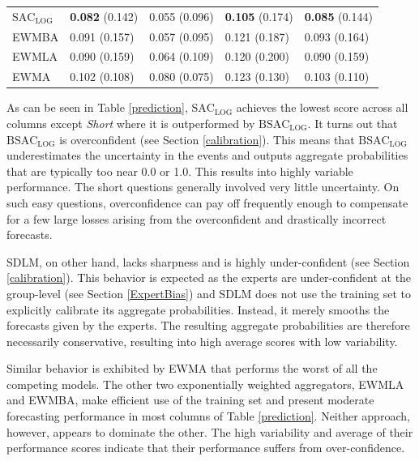 \documentclass[aoas, preprint]{imsart}
\numberwithin{equation}{section}
\theoremstyle{plain}
\begin{document}
\begin{table}
\begin{tabular}{l llll}
$\text{SAC}_{\text{LOG}}$ & \textbf{0.082} (0.142) & 0.055 (0.096) & \textbf{0.105} (0.174) & \textbf{0.085} (0.144)\\ 
EWMBA & 0.091 (0.157) & 0.057 (0.095) & 0.121 (0.187) & 0.093 (0.164)\\ 
EWMLA & 0.090 (0.159) & 0.064 (0.109) & 0.120 (0.200) & 0.090 (0.159)\\ 
EWMA & 0.102 (0.108) & 0.080 (0.075) & 0.123 (0.130) & 0.103 (0.110)\\ 
\hline
   \end{tabular}
\end{table}


As can be seen in Table \ref{prediction}, $\text{SAC}_{\text{LOG}}$ achieves the lowest score across all columns except \textit{Short} where it is outperformed by $\text{BSAC}_{\text{LOG}}$. It turns out that $\text{BSAC}_{\text{LOG}}$ is overconfident (see Section \ref{calibration}). This means that $\text{BSAC}_{\text{LOG}}$ underestimates the uncertainty in the events and outputs aggregate probabilities that are typically too near 0.0 or 1.0. 
This results into highly variable performance. The short questions generally involved very little uncertainty. On such easy questions, overconfidence can pay off frequently enough to compensate for a few large losses arising from the overconfident and drastically incorrect forecasts. 

SDLM, on other hand, lacks sharpness and is highly under-confident (see Section \ref{calibration}). This behavior is expected as the experts are under-confident at the group-level (see Section \ref{ExpertBias}) and SDLM does not use the training set to explicitly calibrate its aggregate probabilities. Instead, it merely smooths the forecasts given by the experts. The resulting aggregate probabilities are therefore necessarily conservative, resulting into high average scores with low variability. 

 Similar behavior is exhibited by EWMA that performs the worst of all the competing models. The other two exponentially weighted aggregators, EWMLA and EWMBA, make efficient use of the training set and present moderate forecasting performance in most columns of Table \ref{prediction}. Neither approach, however, appears to dominate the other. The high variability and average of their performance scores indicate that their performance suffers from over-confidence.
\end{document}
